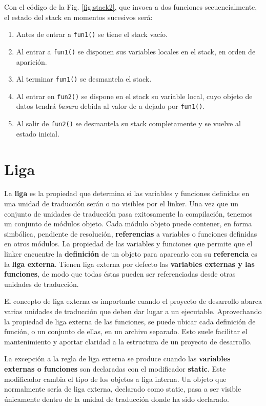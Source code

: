 \begin{ejemplo}
Con el código de la Fig. \ref{fig:stack2}, que invoca a dos funciones secuencialmente, el estado del stack en momentos sucesivos será: 
\begin{enumerate}
\item Antes de entrar a \lstinline{fun1()} se tiene el stack vacío.
\item Al entrar a \lstinline{fun1()} se disponen sus variables locales en el stack, en orden de aparición.
\item Al terminar \lstinline{fun1()} se desmantela el stack.
\item Al entrar en \lstinline{fun2()} se dispone en el stack su variable local, cuyo objeto de datos tendrá \textit{basura} debida al valor de a dejado por \lstinline{fun1()}.
\item Al salir de \lstinline{fun2()} se desmantela su stack completamente y se vuelve al estado inicial.
\end{enumerate}
\end{ejemplo}

\section{Liga}
La \textbf{liga} es la propiedad que determina si las variables y funciones definidas en una unidad de traducción serán o no visibles por el linker. Una vez que un conjunto de unidades de traducción pasa exitosamente la compilación, tenemos un
conjunto de módulos objeto. Cada módulo objeto puede contener, en forma simbólica, pendiente de
resolución, \textbf{referencias} a variables o funciones definidas en otros módulos.
La propiedad de las variables y funciones que permite que el linker encuentre la \textbf{definición} de un
objeto para aparearlo con su \textbf{referencia} es la \textbf{liga externa}. Tienen liga externa por defecto las \textbf{variables externas y
las funciones}, de modo que todas éstas pueden ser referenciadas desde otras unidades de traducción.

El concepto de liga externa es importante cuando el proyecto de desarrollo abarca varias unidades de
traducción que deben dar lugar a un ejecutable. Aprovechando la propiedad de liga externa de las
funciones, se puede ubicar cada definición de función, o un conjunto de ellas, en un archivo separado.
Esto suele facilitar el mantenimiento y aportar claridad a la estructura de un proyecto de desarrollo.

La excepción a la regla de liga externa se produce cuando las \textbf{variables externas o funciones} son
declaradas con el modificador \textbf{static}. Este modificador cambia el tipo de los objetos a liga interna. Un
objeto que normalmente sería de liga externa, declarado como static, pasa a ser visible únicamente
dentro de la unidad de traducción donde ha sido declarado.

